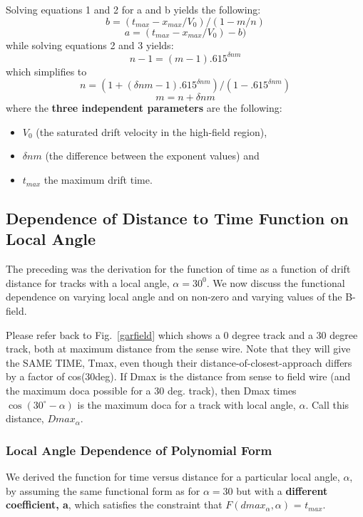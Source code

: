 \documentclass{article}
\begin{document}
Solving equations 1 and 2 for a and b yields the following:
\begin{equation}
\label{bequation}
b = (t_{max} - x_{max}/V_0) / (1 - m/n)
\end{equation}
\begin{equation}
\label{aequation}
a = (t_{max} - x_{max}/V_0) - b)
\end{equation}
while solving equations 2 and 3 yields:
\begin{equation}
n - 1 = (m - 1) .615^{\delta nm}
\end{equation}
which simplifies to 
\begin{equation}
\label{nequation}
n = (1 + (\delta nm - 1) .615^{\delta nm}) / (1 - .615^{\delta nm})
\end{equation}
\begin{equation}
\label{mequation}
m = n + \delta nm
\end{equation}
where the {\bf three independent parameters} are the following:
\begin{itemize}
\item {\bf $V_0$} (the saturated drift velocity in the high-field region), 
\item {\bf $\delta nm$} (the difference between the exponent values) and 
\item {\bf $t_{max}$} the maximum drift time.
\end{itemize}


\subsection{Dependence of Distance to Time Function on Local Angle}
\noindent
The preceding was the derivation for the function of time as a function
of drift distance for tracks with a local angle, $\alpha = 30^0$.  
We now discuss the
functional dependence on varying local angle and on non-zero and varying
values of the B-field.

Please refer back to Fig.~\ref{garfield} which shows a 0 degree track and a 30 degree
track, both at maximum distance from the sense wire.  Note that they will give the
SAME TIME, Tmax, even though their distance-of-closest-approach differs by a factor
of cos(30deg).  If Dmax is the distance from sense to field wire (and the maximum
doca possible for a 30 deg. track), then Dmax times $\cos(30^\circ-\alpha)$ is the maximum
doca for a track with local angle, $\alpha$.  Call this distance, $Dmax_{\alpha}$.

\subsubsection{Local Angle Dependence of Polynomial Form}
We derived the function for time versus distance for a particular local angle, $\alpha$, by
assuming the same functional form as for $\alpha = 30$ but with a {\bf different coefficient, a}, which 
satisfies the constraint that  $F(dmax_{\alpha},\alpha)$ = $t_{max}$.
\end{document}
